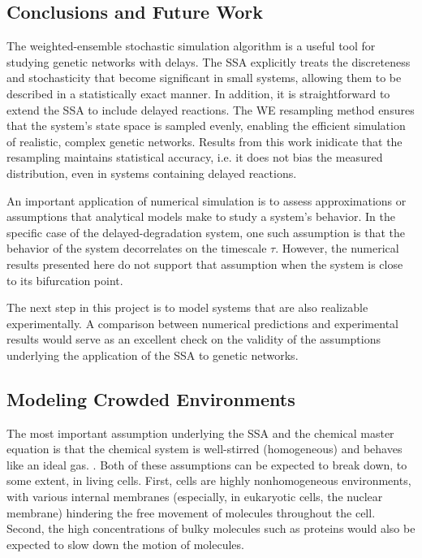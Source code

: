 \documentclass[english,letterpaper,12pt]{article}
\begin{document}
\begin{doublespacing}




\section{Conclusions and Future Work} %
\label{sec:conclusions}

The weighted-ensemble stochastic simulation algorithm is a useful tool for studying genetic networks with delays. The SSA explicitly treats the discreteness and stochasticity that become significant in small systems, allowing them to be described in a statistically exact manner. In addition, it is straightforward to extend the SSA to include delayed reactions. The WE resampling method ensures that the system's state space is sampled evenly, enabling the efficient simulation of realistic, complex genetic networks. Results from this work inidicate that the resampling maintains statistical accuracy, i.e. it does not bias the measured distribution, even in systems containing delayed reactions.

An important application of numerical simulation is to assess approximations or assumptions that analytical models make to study a system's behavior. In the specific case of the delayed-degradation system, one such assumption is that the behavior of the system decorrelates on the timescale $\tau$. However, the numerical results presented here do not support that assumption when the system is close to its bifurcation point.

The next step in this project is to model systems that are also realizable experimentally. A comparison between numerical predictions and experimental results would serve as an excellent check on the validity of the assumptions underlying the application of the SSA to genetic networks.

\subsection{Modeling Crowded Environments} %
\label{sub:diffusion-crowded}

The most important assumption underlying the SSA and the chemical master equation is that the chemical system is well-stirred (homogeneous) and behaves like an ideal gas. . Both of these assumptions can be expected to break down, to some extent, in living cells. First, cells are highly nonhomogeneous environments, with various internal membranes (especially, in eukaryotic cells, the nuclear membrane) hindering the free movement of molecules throughout the cell. Second, the high concentrations of bulky molecules such as proteins would also be expected to slow down the motion of molecules.


\end{doublespacing}
\end{document}

